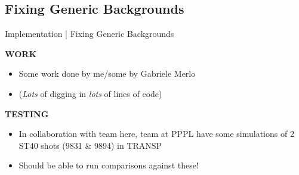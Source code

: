 \subsection{Fixing Generic Backgrounds}
    \begin{frame}{Implementation | Fixing Generic Backgrounds}
        \begin{block}{\bf WORK}
            \begin{itemize}
                \item  Some work done by me/some by Gabriele Merlo
                \item  (\emph{Lots} of digging in \emph{lots} of lines of code)
            \end{itemize}
        \end{block}  \pause
        
        \begin{alertblock}{\bf TESTING}
            \begin{itemize}
                \item  In collaboration with team here, team at PPPL have some simulations of 2 ST40 shots (9831 \& 9894) in TRANSP

                \item  Should be able to run comparisons against these!
            \end{itemize}
        \end{alertblock}
    \end{frame}
    